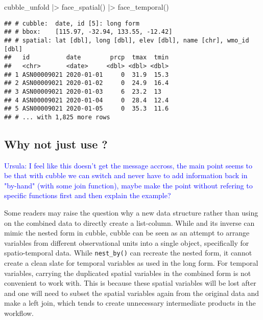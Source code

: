 \documentclass{article}
\newenvironment{Shaded}{\begin{snugshade}}{\end{snugshade}}
\newcommand{\FunctionTok}[1]{\textcolor[rgb]{0.00,0.00,0.00}{#1}}
\newcommand{\NormalTok}[1]{#1}
\newcommand{\SpecialCharTok}[1]{\textcolor[rgb]{0.00,0.00,0.00}{#1}}
\begin{document}
\begin{Shaded}
\begin{Highlighting}[]
\NormalTok{cubble\_unfold }\SpecialCharTok{|\textgreater{}} \FunctionTok{face\_spatial}\NormalTok{() }\SpecialCharTok{|\textgreater{}} \FunctionTok{face\_temporal}\NormalTok{()}
\end{Highlighting}
\end{Shaded}

\begin{verbatim}
## # cubble:  date, id [5]: long form
## # bbox:    [115.97, -32.94, 133.55, -12.42]
## # spatial: lat [dbl], long [dbl], elev [dbl], name [chr], wmo_id [dbl]
##   id          date        prcp  tmax  tmin
##   <chr>       <date>     <dbl> <dbl> <dbl>
## 1 ASN00009021 2020-01-01     0  31.9  15.3
## 2 ASN00009021 2020-01-02     0  24.9  16.4
## 3 ASN00009021 2020-01-03     6  23.2  13  
## 4 ASN00009021 2020-01-04     0  28.4  12.4
## 5 ASN00009021 2020-01-05     0  35.3  11.6
## # ... with 1,825 more rows
\end{verbatim}

\subsection[Why not just use]{Why not just use ?}

\textcolor{blue}{Ursula: I feel like this doesn't get the message accross, the main point seems to be that with cubble we can switch and never have to add information back in "by-hand" (with some join function), maybe make the point without refering to specific functions first and then explain the example?}

Some readers may raise the question why a new data structure rather than using  on the combined data to directly create a list-column. While  and its inverse  can mimic the nested form in cubble, cubble can be seen as an attempt to arrange variables from different observational units into a single object, specifically for spatio-temporal data. While \texttt{nest\_by()} can recreate the nested form, it cannot create a clean slate for temporal variables as used in the long form. For temporal variables, carrying the duplicated spatial variables in the combined form is not convenient to work with. This is because these spatial variables will be lost after  and one will need to subset the spatial variables again from the original data and make a left join, which tends to create unnecessary intermediate products in the workflow.
\end{document}
